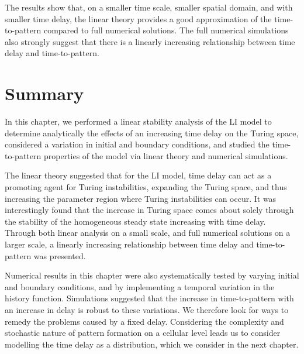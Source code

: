 
The results show that, on a smaller time scale, smaller spatial domain, and with smaller time delay, the linear theory provides a good approximation of the time-to-pattern compared to full numerical solutions. The full numerical simulations also strongly suggest that there is a linearly increasing relationship between time delay and time-to-pattern.
\section{Summary}

In this chapter, we performed a linear stability analysis of the LI model to determine analytically the effects of an increasing time delay on the Turing space, considered a variation in initial and boundary conditions, and studied the time-to-pattern properties of the model via linear theory and numerical simulations.

The linear theory suggested that for the LI model, time delay can act as a promoting agent for Turing instabilities, expanding the Turing space, and thus increasing the parameter region where Turing instabilities can occur. It was interestingly found that the increase in Turing space comes about solely through the stability of the homogeneous steady state increasing with time delay. Through both linear analysis on a small scale, and full numerical solutions on a larger scale, a linearly increasing relationship between time delay and time-to-pattern was presented.

Numerical results in this chapter were also systematically tested by varying initial and boundary conditions, and by implementing a temporal variation in the history function. Simulations suggested that the increase in time-to-pattern with an increase in delay is robust to these variations. We therefore look for ways to remedy the problems caused by a fixed delay. Considering the complexity and stochastic nature of pattern formation on a cellular level leads us to consider modelling the time delay as a distribution, which we consider in the next chapter.
